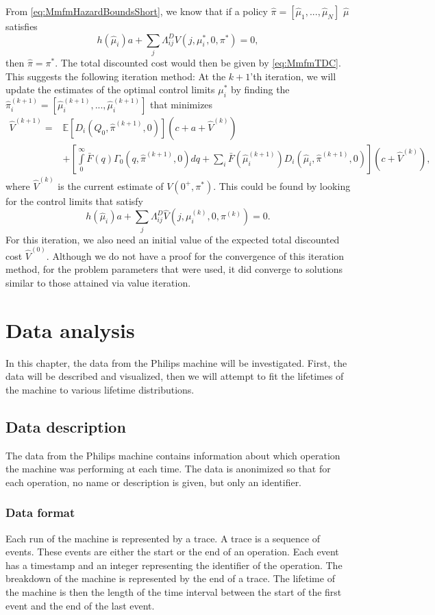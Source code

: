 \documentclass[a4paper]{thesis}
\theoremstyle{definition}
\begin{document}
	From \eqref{eq:MmfmHazardBoundsShort}, we know that if a policy $\hat\pi=[\hat\mu_1,...,\hat\mu_N]$ $\hat{\mu}$ satisfies
	\[
	h(\hat\mu_i)a+\sum\limits_j\Lambda^D_{ij}V(j,\mu_i^*,0,\pi^*)=0,\]
	then $\hat{\pi}=\pi^*$.
	The total discounted cost would then be given by \eqref{eq:MmfmTDC}.
	This suggests the following iteration method:
	At the $k+1$'th iteration, we will update the estimates of the optimal control limits $\mu_i^*$ by finding the $\hat{\pi}_i^{(k+1)}=[\hat{\mu}_i^{(k+1)},...,\hat{\mu}_i^{(k+1)}]$ that minimizes
	\[
	\begin{split}
	\hat{V}^{(k+1)}=&\mathbb{E}[D_{i}(Q_0,\hat\pi^{(k+1)},0)](c+a+\hat{V}^{(k)})\\
	&+\left[\int\limits_0^\infty \bar{F}(q)\Gamma_0(q,\hat\pi^{(k+1)},0)dq+\sum\limits_i\bar{F}(\hat\mu_i^{(k+1)})D_{i}(\hat\mu_i,\hat\pi^{(k+1)},0)\right](c+\hat{V}^{(k)}),
	\end{split}
	\]
	where $\hat{V}^{(k)}$ is the current estimate of $V(0^+,\pi^*)$.
	This could be found by looking for the control limits that satisfy
	\begin{equation}
	h(\hat\mu_i)a+\sum\limits_j\Lambda^D_{ij}\hat V(j,\mu_i^{(k)},0,\pi^{(k)})=0.
	\end{equation}
	For this iteration, we also need an initial value of the expected total discounted cost $\hat{V}^{(0)}$.
	Although we do not have a proof for the convergence of this iteration method, for the problem parameters that were used, it did converge to solutions similar to those attained via value iteration. 
	\chapter{Data analysis}\label{chapter:DataAnalysis}
	In this chapter, the data from the Philips machine will be investigated.
	First, the data will be described and visualized, then we will attempt to fit the lifetimes of the machine to various lifetime distributions.
	\section{Data description}
	The data from the Philips machine contains information about which operation the machine was performing at each time.
	The data is anonimized so that for each operation, no name or description is given, but only an identifier.
	\subsection{Data format}
	Each run of the machine is represented by a trace.
	A trace is a sequence of events.
	These events are either the start or the end of an operation.
	Each event has a timestamp and an integer representing the identifier of the operation.
	The breakdown of the machine is represented by the end of a trace.
	The lifetime of the machine is then the length of the time interval between the start of the first event and the end of the last event.
	
\end{document}

